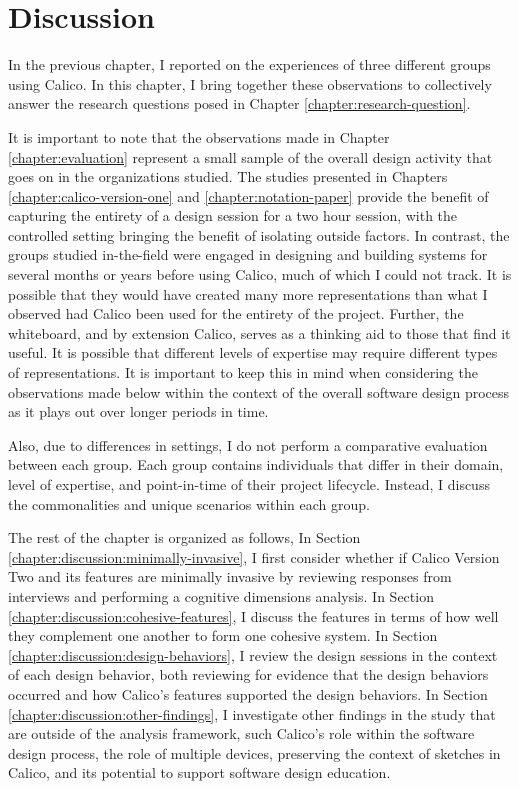\chapter{Discussion}
\label{chapter:discussion}

In the previous chapter, I reported on the experiences of three different groups using Calico. In this chapter, I bring together these observations to collectively answer the research questions posed in Chapter \ref{chapter:research-question}. 

It is important to note that the observations made in Chapter \ref{chapter:evaluation} represent a small sample of the overall design activity that goes on in the organizations studied. The studies presented in Chapters \ref{chapter:calico-version-one} and \ref{chapter:notation-paper} provide the benefit of capturing the entirety of a design session for a two hour session, with the controlled setting bringing the benefit of isolating outside factors. In contrast, the groups studied in-the-field were engaged in designing and building systems for several months or years before using Calico, much of which I could not track. It is possible that they would have created many more representations than what I observed had Calico been used for the entirety of the project. Further, the whiteboard, and by extension Calico, serves as a thinking aid to those that find it useful. It is possible that different levels of expertise may require different types of representations. It is important to keep this in mind when considering the observations made below within the context of the overall software design process as it plays out over longer periods in time.

Also, due to differences in settings, I do not perform a comparative evaluation between each group. Each group contains individuals that differ in their domain, level of expertise, and point-in-time of their project lifecycle. Instead, I discuss the commonalities and unique scenarios within each group.

The rest of the chapter is organized as follows, In Section \ref{chapter:discussion:minimally-invasive}, I first consider whether if Calico Version Two and its features are minimally invasive by reviewing responses from interviews and performing a cognitive dimensions analysis. In Section \ref{chapter:discussion:cohesive-features}, I discuss the features in terms of how well they complement one another to form one cohesive system. In Section \ref{chapter:discussion:design-behaviors}, I review the design sessions in the context of each design behavior, both reviewing for evidence that the design behaviors occurred and how Calico's features supported the design behaviors. In Section \ref{chapter:discussion:other-findings}, I investigate other findings in the study that are outside of the analysis framework, such Calico's role within the software design process, the role of multiple devices, preserving the context of sketches in Calico, and its potential to support software design education.

